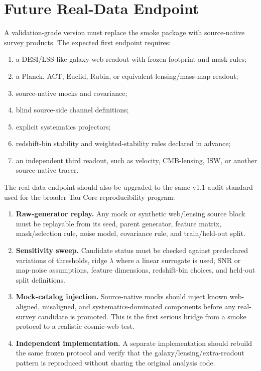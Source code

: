 \documentclass[11pt]{article}
\begin{document}
\section{Future Real-Data Endpoint}

A validation-grade version must replace the smoke package with source-native
survey products.  The expected first endpoint requires:

\begin{enumerate}
\item a DESI/LSS-like galaxy web readout with frozen footprint and mask rules;
\item a Planck, ACT, Euclid, Rubin, or equivalent lensing/mass-map readout;
\item source-native mocks and covariance;
\item blind source-side channel definitions;
\item explicit systematics projectors;
\item redshift-bin stability and weighted-stability rules declared in advance;
\item an independent third readout, such as velocity, CMB-lensing, ISW, or
another source-native tracer.
\end{enumerate}

The real-data endpoint should also be upgraded to the same v1.1 audit standard
used for the broader Tau Core reproducibility program:

\begin{enumerate}
\item \textbf{Raw-generator replay.}  Any mock or synthetic web/lensing source
block must be replayable from its seed, parent generator, feature matrix,
mask/selection rule, noise model, covariance rule, and train/held-out split.
\item \textbf{Sensitivity sweep.}  Candidate status must be checked against
predeclared variations of thresholds, ridge \(\lambda\) where a linear surrogate
is used, SNR or map-noise assumptions, feature dimensions, redshift-bin choices,
and held-out split definitions.
\item \textbf{Mock-catalog injection.}  Source-native mocks should inject known
web-aligned, misaligned, and systematics-dominated components before any
real-survey candidate is promoted.  This is the first serious bridge from a
smoke protocol to a realistic cosmic-web test.
\item \textbf{Independent implementation.}  A separate implementation should
rebuild the same frozen protocol and verify that the galaxy/lensing/extra-readout
pattern is reproduced without sharing the original analysis code.
\end{enumerate}
\end{document}
